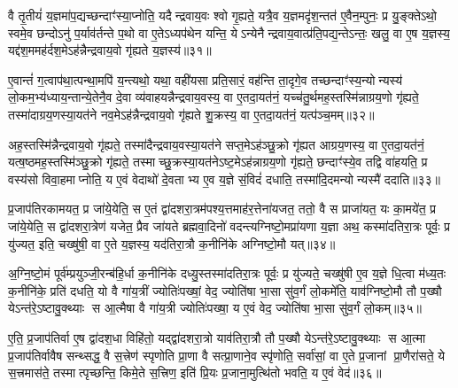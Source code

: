 वै तृ॒तीयं॑ य॒ज्ञमा॑प॒द्यच्छन्दाꣳ॑स्या॒प्नोति॒ यदैन्द्रवाय॒वः श्वो गृ॒ह्यते॒ यत्रै॒व य॒ज्ञमदृ॑श॒न्तत॑ ए॒वैन॒म्पुनः॒ प्र यु॒ङ्क्तेऽथो॒ स्वमे॒व छन्दोऽनु॑ प॒र्याव॑र्तन्ते प॒थो वा ए॒तेऽध्यप॑थेन यन्ति॒ येऽन्येनैन्द्रवाय॒वात्प्र॑ति॒पद्य॒न्तेऽन्तः॒ खलु॒ वा ए॒ष य॒ज्ञस्य॒ यद्द॑श॒ममह॑र्दश॒मेऽह॑न्नैन्द्रवाय॒वो गृ॑ह्यते य॒ज्ञस्य॑॥३१॥

ए॒वान्तं॑ ग॒त्वाप॑था॒त्पन्था॒मपि॑ य॒न्त्यथो॒ यथा॒ वही॑यसा प्रति॒सारं॒ वह॑न्ति ता॒दृगे॒व तच्छन्दाꣳ॑स्य॒न्योन्यस्य॑ लो॒कम॒भ्य॑ध्याय॒न्तान्ये॒तेनै॒व दे॒वा व्य॑वाहयन्नैन्द्रवाय॒वस्य॒ वा ए॒तदा॒यत॑नं॒ यच्च॑तु॒र्थमह॒स्तस्मि॑न्नाग्रय॒णो गृ॑ह्यते॒ तस्मा॑दाग्रय॒णस्या॒यत॑ने नव॒मेऽह॑न्नैन्द्रवाय॒वो गृ॑ह्यते शु॒क्रस्य॒ वा ए॒तदा॒यत॑नं॒ यत्प॑ञ्च॒मम्॥३२॥

अह॒स्तस्मि॑न्नैन्द्रवाय॒वो गृ॑ह्यते॒ तस्मा॑दैन्द्रवाय॒वस्या॒यत॑ने सप्त॒मेऽह॑ञ्छु॒क्रो गृ॑ह्यत आग्रय॒णस्य॒ वा ए॒तदा॒यत॑नं॒ यत्ष॒ष्ठमह॒स्तस्मि॑ञ्छु॒क्रो गृ॑ह्यते॒ तस्माच्छु॒क्रस्या॒यत॑नेऽष्ट॒मेऽह॑न्नाग्रय॒णो गृ॑ह्यते॒ छन्दाꣳ॑स्ये॒व तद्वि वा॑हयति॒ प्र वस्य॑सो विवा॒हमाप्नोति॒ य ए॒वं वेदाथो॑ दे॒वताभ्य ए॒व य॒ज्ञे सं॒विदं॑ दधाति॒ तस्मा॑दि॒दमन्योन्यस्मै॑ ददाति॥३३॥

{\anuvakamend[{ए॒तद्वै प॑ञ्च॒मेऽह॒न्त्रैष्टु॑भ ए॒तद्गृ॑ह्यते य॒ज्ञस्य॑ प़ञ्च॒मम॒न्यस्मा॒ एक॑ञ्च॥८॥}]}

प्र॒जाप॑तिरकामयत॒ प्र जा॑ये॒येति॒ स ए॒तं द्वा॑दशरा॒त्रम॑पश्य॒त्तमाह॑र॒त्तेना॑यजत॒ ततो॒ वै स प्राजा॑यत॒ यः का॒मये॑त॒ प्र जा॑ये॒येति॒ स द्वा॑दशरा॒त्रेण॑ यजेत॒ प्रैव जा॑यते ब्रह्मवा॒दिनो॑ वदन्त्यग्निष्टो॒मप्रा॑यणा य॒ज्ञा अथ॒ कस्मा॑दतिरा॒त्रः पूर्वः॒ प्र यु॑ज्यत॒ इति॒ चख्षु॑षी॒ वा ए॒ते य॒ज्ञस्य॒ यद॑तिरा॒त्रौ क॒नीनि॑के अग्निष्टो॒मौ यत्॥३४॥

अ॒ग्नि॒ष्टो॒मं पूर्व॑म्प्रयुञ्जी॒रन्ब॑हि॒र्धा क॒नीनि॑के दध्यु॒स्तस्मा॑दतिरा॒त्रः पूर्वः॒ प्र यु॑ज्यते॒ चख्षु॑षी ए॒व य॒ज्ञे धि॒त्वा म॑ध्य॒तः क॒नीनि॑के॒ प्रति॑ दधति॒ यो वै गा॑य॒त्रीं ज्योतिः॑पख्षां॒ वेद॒ ज्योति॑षा भा॒सा सु॑व॒र्गं लो॒कमे॑ति॒ याव॑ग्निष्टो॒मौ तौ प॒ख्षौ येऽन्त॑रे॒ऽष्टावु॒क्थ्याः स आ॒त्मैषा वै गा॑य॒त्री ज्योतिः॑पख्षा॒ य ए॒वं वेद॒ ज्योति॑षा भा॒सा सु॑व॒र्गं लो॒कम्॥३५॥

ए॒ति॒ प्र॒जाप॑तिर्वा ए॒ष द्वा॑दश॒धा विहि॑तो॒ यद्द्वा॑दशरा॒त्रो याव॑तिरा॒त्रौ तौ प॒ख्षौ येऽन्त॑रे॒ऽष्टावु॒क्थ्याः स आ॒त्मा प्र॒जाप॑तिर्वावैष सन्थ्सद्ध॒ वै स॒त्त्रेण॑ स्पृणोति प्रा॒णा वै सत्प्रा॒णाने॒व स्पृ॑णोति॒ सर्वा॑सां॒ वा ए॒ते प्र॒जानां प्रा॒णैरा॑सते॒ ये स॒त्त्रमास॑ते॒ तस्मात्पृच्छन्ति॒ किमे॒ते स॒त्त्रिण॒ इति॑ प्रि॒यः प्र॒जाना॒मुत्थि॑तो भवति॒ य ए॒वं वेद॑॥३६॥

{\anuvakamend[{अ॒ग्नि॒ष्टो॒मौ यथ्सु॑व॒र्गल्लों॒कं प्रि॒यः प्र॒जाना॒म्पञ्च॑ च॥९॥}]}

